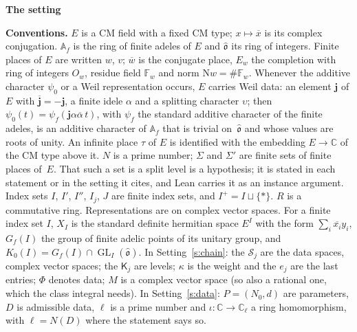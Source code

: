 \documentclass[11pt,a4paper]{article}
\newcommand{\m}[1]{\mbox{$#1$}}        %
\newcommand{\sect}[2]{\refstepcounter{section}\label{#2}\par\addvspace{19pt plus 4pt minus 2pt}\Needspace{7\baselineskip}%
  \noindent\llap{{\fontsize{13.2}{16}\selectfont\bfseries\color{inkfaint}\thesection}\hspace{9pt}}%
  {\fontsize{13.2}{16}\selectfont\bfseries\color{ink}#1}\par\nopagebreak\vspace{-1pt}}
\theoremstyle{plainx}
\theoremstyle{uprightx}
\newenvironment{conventions}{\par\addvspace{5pt}\noindent\textbf{Conventions.}\enspace\ignorespaces}{\par\addvspace{3pt}}
\newcommand{\CC}{\mathbb{C}}
\newcommand{\Af}{\mathbb{A}_f}
\newcommand{\Oh}{\hat{\mathfrak{o}}}
\newcommand{\GL}{\operatorname{GL}}
\newcommand{\cj}[1]{\overline{#1}}
\newcommand{\st}{\ast}                         %
\newcommand{\Ip}[1]{#1^{+}}                    %
\newcommand{\Gf}[1]{G_f(#1)}                   %
\newcommand{\Kz}[1]{K_0(#1)}
\newcommand{\jm}{\iota}
\newcommand{\ND}{N(D)}
\begin{document}
\sect{The setting}{s:setting}
\begin{conventions}\label{c:conventions}
$E$ is a CM field with a fixed CM type; \m{x\mapsto\cj{x}} is its complex conjugation. $\Af$ is the ring of finite
adeles of $E$ and $\Oh$ its ring of integers. Finite places of $E$ are written $w$, $v$; $\cj{w}$ is the
conjugate place, $E_w$ the completion with ring of integers $O_w$, residue field $\mathbb{F}_w$ and norm
\m{\mathrm{N}w=\#\mathbb{F}_w}. Whenever the additive character $\psi_0$ or a Weil representation occurs, $E$ carries
Weil data: an element $\mathbf{j}$ of $E$ with \m{\cj{\mathbf{j}}=-\mathbf{j}}, a finite idele $\alpha$ and a
splitting character $\upsilon$; then \m{\psi_0(t)=\psi_f(\mathbf{j}\alpha\cj{\alpha}\,t)}, with $\psi_f$ the standard
additive character of the finite adeles, is an additive character of $\Af$ that is trivial on~$\Oh$ and whose
values are roots of unity. An infinite place $\tau$ of $E$ is identified with the embedding \m{E\to\CC} of the CM
type above it. $N$ is a prime number; $\Sigma$ and $\Sigma'$ are finite sets of finite places of~$E$. That such a
set is a split level is a hypothesis; it is stated in each statement or in the setting it cites, and Lean carries
it as an instance argument. Index sets $I$, $I'$, $I''$, $I_j$, $J$ are finite index sets, and
\m{\Ip{I}=I\sqcup\{\st\}}. $R$ is a commutative ring. Representations are on complex vector spaces. For a finite
index set $I$, $X_I$ is the standard definite hermitian space \m{E^{I}} with the form \m{\sum_i\cj{x_i}y_i},
\m{\Gf{I}} the group of finite adelic points of its unitary group, and \m{\Kz{I}=\Gf{I}\cap\GL_I(\Oh)}. In
Setting~\ref{s:chain}: the $\mathcal{S}_j$ are the data spaces, complex vector spaces; the $\mathsf{K}_j$ are levels;
$\kappa$ is the weight and the $e_j$ are the last entries; $\Phi$ denotes data; $M$ is a complex vector space (so
also a rational one, which the class integral needs). In Setting~\ref{s:data}: \m{P=(N_0,d)} are parameters, $D$
is admissible data, $\ell$ is a prime number and \m{\jm\colon\CC\to\CC_{\ell}} a ring homomorphism, with
\m{\ell=\ND} where the statement says so.
\end{conventions}
\end{document}
